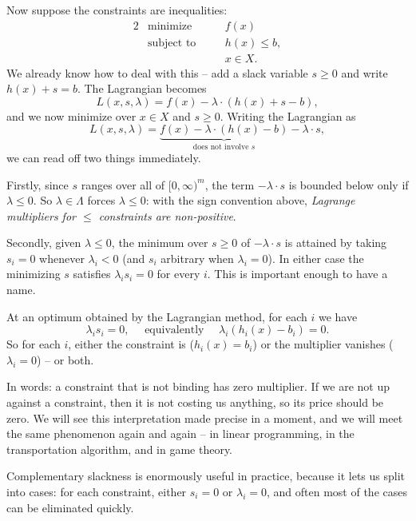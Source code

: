 \documentclass[a4paper]{scrartcl}
\begin{document}
Now suppose the constraints are inequalities:
\begin{alignat*}{2}
    & \text{minimize} \quad && f(x) \\
    & \text{subject to} \quad && h(x) \leq b, \\
    & && x \in X.
\end{alignat*}
We already know how to deal with this -- add a slack variable $s \geq 0$ and write $h(x) + s = b$. The Lagrangian becomes
$$
L(x, s, \lambda) = f(x) - \lambda \cdot (h(x) + s - b),
$$
and we now minimize over $x \in X$ and $s \geq 0$. Writing the Lagrangian as
$$
L(x, s, \lambda) = \underbrace{f(x) - \lambda\cdot(h(x) - b)}_{\text{does not involve }s} - \lambda \cdot s,
$$
we can read off two things immediately.

Firstly, since $s$ ranges over all of $[0, \infty)^m$, the term $-\lambda \cdot s$ is bounded below only if $\lambda \leq 0$. So $\lambda \in \Lambda$ forces $\lambda \leq 0$: with the sign convention above, \emph{Lagrange multipliers for $\leq$ constraints are non-positive}.

Secondly, given $\lambda \leq 0$, the minimum over $s \geq 0$ of $-\lambda\cdot s$ is attained by taking $s_i = 0$ whenever $\lambda_i < 0$ (and $s_i$ arbitrary when $\lambda_i = 0$). In either case the minimizing $s$ satisfies $\lambda_i s_i = 0$ for every $i$. This is important enough to have a name.

\begin{theorem}
    At an optimum obtained by the Lagrangian method, for each $i$ we have
    $$
    \lambda_i s_i = 0, \quad\text{ equivalently }\quad \lambda_i\left(h_i(x) - b_i\right) = 0.
    $$
    So for each $i$, either the constraint is  ($h_i(x) = b_i$) or the multiplier vanishes ($\lambda_i = 0$) -- or both.
\end{theorem}

In words: a constraint that is not binding has zero multiplier. If we are not up against a constraint, then it is not costing us anything, so its price should be zero. We will see this interpretation made precise in a moment, and we will meet the same phenomenon again and again -- in linear programming, in the transportation algorithm, and in game theory.

Complementary slackness is enormously useful in practice, because it lets us split into cases: for each constraint, either $s_i = 0$ or $\lambda_i = 0$, and often most of the cases can be eliminated quickly.
\end{document}
